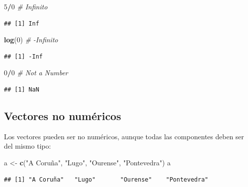 \documentclass[]{book}
\newenvironment{Shaded}{\begin{snugshade}}{\end{snugshade}}
\newcommand{\CommentTok}[1]{\textcolor[rgb]{0.56,0.35,0.01}{\textit{#1}}}
\newcommand{\DecValTok}[1]{\textcolor[rgb]{0.00,0.00,0.81}{#1}}
\newcommand{\KeywordTok}[1]{\textcolor[rgb]{0.13,0.29,0.53}{\textbf{#1}}}
\newcommand{\NormalTok}[1]{#1}
\newcommand{\OperatorTok}[1]{\textcolor[rgb]{0.81,0.36,0.00}{\textbf{#1}}}
\newcommand{\StringTok}[1]{\textcolor[rgb]{0.31,0.60,0.02}{#1}}
\begin{document}
\begin{Shaded}
\begin{Highlighting}[]
\DecValTok{5}\OperatorTok{/}\DecValTok{0}  \CommentTok{# Infinito}
\end{Highlighting}
\end{Shaded}

\begin{verbatim}
## [1] Inf
\end{verbatim}

\begin{Shaded}
\begin{Highlighting}[]
\KeywordTok{log}\NormalTok{(}\DecValTok{0}\NormalTok{)  }\CommentTok{# -Infinito}
\end{Highlighting}
\end{Shaded}

\begin{verbatim}
## [1] -Inf
\end{verbatim}

\begin{Shaded}
\begin{Highlighting}[]
\DecValTok{0}\OperatorTok{/}\DecValTok{0}  \CommentTok{# Not a Number}
\end{Highlighting}
\end{Shaded}

\begin{verbatim}
## [1] NaN
\end{verbatim}

\hypertarget{vectores-no-numericos}{%
\subsection{Vectores no numéricos}\label{vectores-no-numericos}}

Los vectores pueden ser no numéricos, aunque todas las componentes deben ser del mismo tipo:

\begin{Shaded}
\begin{Highlighting}[]
\NormalTok{a <-}\StringTok{ }\KeywordTok{c}\NormalTok{(}\StringTok{"A Coruña"}\NormalTok{, }\StringTok{"Lugo"}\NormalTok{, }\StringTok{"Ourense"}\NormalTok{, }\StringTok{"Pontevedra"}\NormalTok{)}
\NormalTok{a}
\end{Highlighting}
\end{Shaded}

\begin{verbatim}
## [1] "A Coruña"   "Lugo"       "Ourense"    "Pontevedra"
\end{verbatim}
\end{document}
